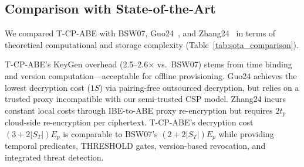 ﻿\documentclass[lettersize,journal]{IEEEtran}
\begin{document}
\begin{table}[!t]
\centering
\renewcommand{\arraystretch}{1.1}
\caption{Threshold, revocation, and hash chain performance. SS1024, $N{=}20$ trials, mean $\pm$ std.}
\label{tab:threshold}
\footnotesize
{}
\end{table}

\subsection{Comparison with State-of-the-Art}
\label{subsec:sota}

We compared T-CP-ABE with BSW07,
Guo24~\cite{Guo2024}, and
Zhang24~\cite{Zhang2024_TDSC} in terms of theoretical computational and
storage complexity (Table~\ref{tab:sota_comparison}).

T-CP-ABE's KeyGen overhead (2.5--2.6$\times$ vs.\ BSW07) stems from
time binding and version computation---acceptable for offline
provisioning. Guo24 achieves the lowest decryption cost ($1S$) via
pairing-free outsourced decryption, but relies on a trusted proxy
incompatible with our semi-trusted CSP model. Zhang24 incurs constant
local costs through IBE-to-ABE proxy re-encryption but requires $2t_p$
cloud-side re-encryption per ciphertext. T-CP-ABE's decryption cost
$(3+2|S_T|)E_p$ is comparable to BSW07's $(2+2|S_T|)E_p$ while
providing temporal predicates, THRESHOLD gates, version-based
revocation, and integrated threat detection.
\end{document}
